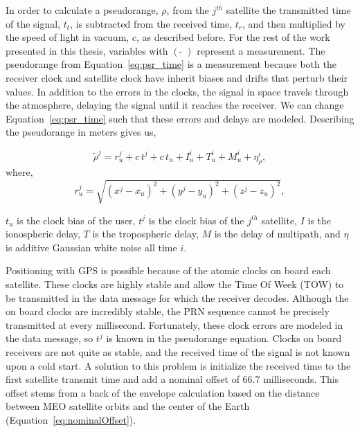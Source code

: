 In order to calculate a pseudorange, \(\rho \), from the \(j^{th}\) satellite the transmitted time of the signal, \(t_t\), is subtracted from the received time, \(t_r\), and then multiplied by the speed of light in vacuum, \(c\), as described before. For the rest of the work presented in this thesis, variables with \({\left(\;\tilde{}\;\right)}\) represent a measurement. The pseudorange from Equation~\ref{eq:psr_time} is a measurement because both the receiver clock and satellite clock have inherit biases and drifts that perturb their values. In addition to the errors in the clocks, the signal in space travels through the atmosphere, delaying the signal until it reaches the receiver. We can change Equation~\ref{eq:psr_time} such that these errors and delays are modeled. Describing the pseudorange in meters gives us,

\begin{equation}\label{eq:psr_meters}
    \tilde{\rho}^j = r_u^j + c\,t^j + c\,t_u + I^i_u + T^i_u+ M^i_u + \eta^i_{\rho},
\end{equation}
where,
\begin{equation}\label{eq:range_meters}
    r^j_u = \sqrt{{\left(x^j - x_u\right)}^2 + {\left(y^j - y_u\right)}^2 + {\left(z^j - z_u\right)}^2},
\end{equation}

\(t_u\) is the clock bias of the user, \(t^j\) is the clock bias of the \(j^{th}\) satellite, \(I\) is the ionospheric delay, \(T\) is the tropospheric delay, \(M\) is the delay of multipath, and \(\eta \) is additive Gaussian white noise all time \(i\).

Positioning with GPS is possible because of the atomic clocks on board each satellite. These clocks are highly stable and allow the Time Of Week (TOW) to be transmitted in the data message for which the receiver decodes. Although the on board clocks are incredibly stable, the PRN sequence cannot be precisely transmitted at every millisecond. Fortunately, these clock errors are modeled in the data message, so \(t^j\) is known in the pseudorange equation. Clocks on board receivers are not quite as stable, and the received time of the signal is not known upon a cold start. A solution to this problem is initialize the received time to the first satellite transmit time and add a nominal offset of \(66.7\) milliseconds. This offset stems from a back of the envelope calculation based on the distance between MEO satellite orbits and the center of the Earth (Equation~\ref{eq:nominalOffset}).

